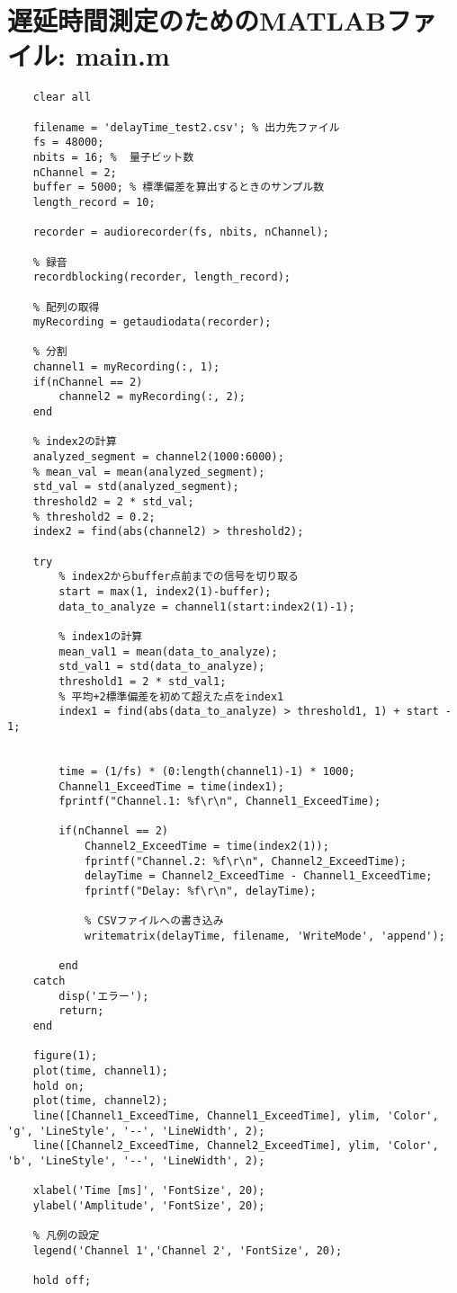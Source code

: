 \section{遅延時間測定のためのMATLABファイル: main.m}
\begin{verbatim}
    clear all

    filename = 'delayTime_test2.csv'; % 出力先ファイル
    fs = 48000; 
    nbits = 16; %  量子ビット数
    nChannel = 2; 
    buffer = 5000; % 標準偏差を算出するときのサンプル数
    length_record = 10; 

    recorder = audiorecorder(fs, nbits, nChannel);

    % 録音
    recordblocking(recorder, length_record); 

    % 配列の取得
    myRecording = getaudiodata(recorder);

    % 分割
    channel1 = myRecording(:, 1);
    if(nChannel == 2)
        channel2 = myRecording(:, 2);
    end

    % index2の計算
    analyzed_segment = channel2(1000:6000);
    % mean_val = mean(analyzed_segment);
    std_val = std(analyzed_segment);
    threshold2 = 2 * std_val;
    % threshold2 = 0.2;
    index2 = find(abs(channel2) > threshold2); 

    try
        % index2からbuffer点前までの信号を切り取る
        start = max(1, index2(1)-buffer);  
        data_to_analyze = channel1(start:index2(1)-1);

        % index1の計算
        mean_val1 = mean(data_to_analyze);
        std_val1 = std(data_to_analyze);
        threshold1 = 2 * std_val1;
        % 平均+2標準偏差を初めて超えた点をindex1
        index1 = find(abs(data_to_analyze) > threshold1, 1) + start - 1;

        
        time = (1/fs) * (0:length(channel1)-1) * 1000;
        Channel1_ExceedTime = time(index1);
        fprintf("Channel.1: %f\r\n", Channel1_ExceedTime);

        if(nChannel == 2)
            Channel2_ExceedTime = time(index2(1));
            fprintf("Channel.2: %f\r\n", Channel2_ExceedTime);
            delayTime = Channel2_ExceedTime - Channel1_ExceedTime;
            fprintf("Delay: %f\r\n", delayTime);

            % CSVファイルへの書き込み
            writematrix(delayTime, filename, 'WriteMode', 'append');

        end
    catch
        disp('エラー');
        return;
    end

    figure(1); 
    plot(time, channel1);
    hold on;
    plot(time, channel2);
    line([Channel1_ExceedTime, Channel1_ExceedTime], ylim, 'Color', 'g', 'LineStyle', '--', 'LineWidth', 2);
    line([Channel2_ExceedTime, Channel2_ExceedTime], ylim, 'Color', 'b', 'LineStyle', '--', 'LineWidth', 2);
    
    xlabel('Time [ms]', 'FontSize', 20);  
    ylabel('Amplitude', 'FontSize', 20);  

    % 凡例の設定
    legend('Channel 1','Channel 2', 'FontSize', 20);

    hold off;

\end{verbatim}